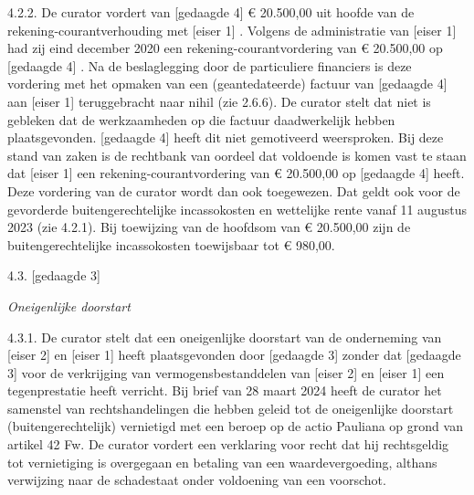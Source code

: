\documentclass[
  dutch,
  a4paper,
]{article}
\begin{document}
4.2.2. De curator vordert van {[}gedaagde 4{]} € 20.500,00 uit hoofde van de rekening-courantverhouding met {[}eiser 1{]} . Volgens de administratie van {[}eiser 1{]} had zij eind december 2020 een rekening-courantvordering van € 20.500,00 op {[}gedaagde 4{]} . Na de beslaglegging door de particuliere financiers is deze vordering met het opmaken van een (geantedateerde) factuur van {[}gedaagde 4{]} aan {[}eiser 1{]} teruggebracht naar nihil (zie 2.6.6). De curator stelt dat niet is gebleken dat de werkzaamheden op die factuur daadwerkelijk hebben plaatsgevonden. {[}gedaagde 4{]} heeft dit niet gemotiveerd weersproken. Bij deze stand van zaken is de rechtbank van oordeel dat voldoende is komen vast te staan dat {[}eiser 1{]} een rekening-courantvordering van € 20.500,00 op {[}gedaagde 4{]} heeft. Deze vordering van de curator wordt dan ook toegewezen. Dat geldt ook voor de gevorderde buitengerechtelijke incassokosten en wettelijke rente vanaf 11 augustus 2023 (zie 4.2.1). Bij toewijzing van de hoofdsom van € 20.500,00 zijn de buitengerechtelijke incassokosten toewijsbaar tot € 980,00.

4.3. {[}gedaagde 3{]}

\emph{Oneigenlijke doorstart}

4.3.1. De curator stelt dat een oneigenlijke doorstart van de onderneming van {[}eiser 2{]} en {[}eiser 1{]} heeft plaatsgevonden door {[}gedaagde 3{]} zonder dat {[}gedaagde 3{]} voor de verkrijging van vermogensbestanddelen van {[}eiser 2{]} en {[}eiser 1{]} een tegenprestatie heeft verricht. Bij brief van 28 maart 2024 heeft de curator het samenstel van rechtshandelingen die hebben geleid tot de oneigenlijke doorstart (buitengerechtelijk) vernietigd met een beroep op de actio Pauliana op grond van artikel 42 Fw. De curator vordert een verklaring voor recht dat hij rechtsgeldig tot vernietiging is overgegaan en betaling van een waardevergoeding, althans verwijzing naar de schadestaat onder voldoening van een voorschot.
\end{document}
